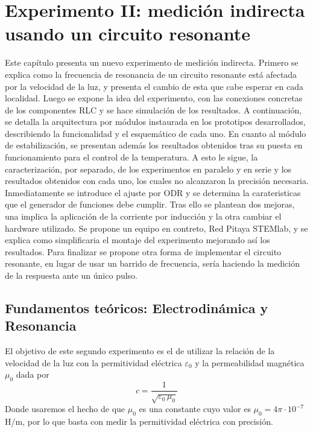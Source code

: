 \chapter{Experimento II: medición indirecta usando un circuito resonante} \label{cap:3}

Este capítulo presenta un nuevo experimento de medición indirecta. Primero se explica como la frecuencia de resonancia de un circuito resonante está afectada por la velocidad de la luz, y presenta el cambio de esta que cabe esperar en cada localidad. Luego se expone la idea del experimento, con las conexiones concretas de los componentes RLC y se hace simulación de los resultados. A continuación, se detalla la arquitectura por módulos instaurada en los prototipos desarrollados, describiendo la funcionalidad y el esquemático de cada uno. En cuanto al módulo de estabilización, se presentan además los resultados obtenidos tras su puesta en funcionamiento para el control de la temperatura. A esto le sigue, la caracterización, por separado, de los experimentos en paralelo y en serie  y  los resultados obtenidos con cada uno, los cuales no alcanzaron la precisión necesaria. Inmediatamente se introduce el ajuste por \ac{ODR} y se determina la carateristicas que el generador de funciones debe cumplir. Tras ello se plantean dos mejoras, una implica la aplicación de la corriente por inducción y la otra cambiar el hardware utilizado. Se propone un equipo en contreto,  Red Pitaya STEMlab, y se explica como simplificaria el montaje del experimento mejorando así los resultados. Para finalizar se propone otra forma de implementar el circuito resonante, en lugar de usar un barrido de frecuencia, sería haciendo la medición de la respuesta ante un único pulso.

\section{Fundamentos teóricos: Electrodinámica y Resonancia}


El objetivo de este segundo experimento es el de utilizar la relación de la velocidad de la luz con la permitividad eléctrica $\varepsilon_0$ y la permeabilidad magnética $\mu_0$ dada por
\begin{equation} \label{permitividadyc}
c=\frac{1}{\sqrt{\varepsilon_0\,\mu_0}}
\end{equation}
Donde usaremos el hecho de que $\mu_0$ es una constante cuyo valor es $\mu_0 = 4\pi\cdot 10^{-7}$H/m, por lo que basta con medir la permitividad eléctrica con precisión.

